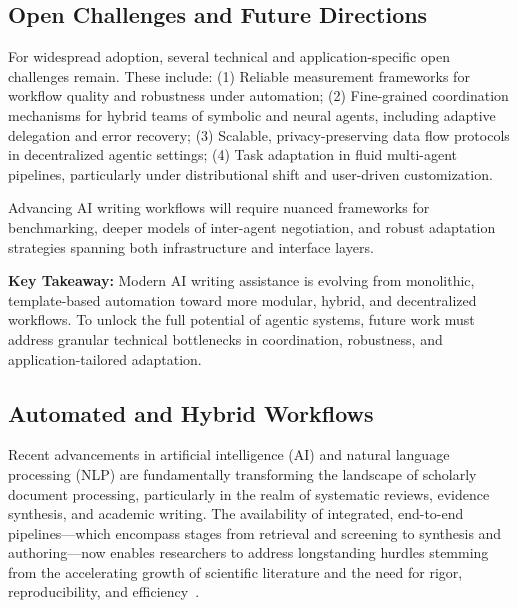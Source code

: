 \documentclass[sigconf]{acmart}
\begin{document}
\subsection{Open Challenges and Future Directions}
For widespread adoption, several technical and application-specific open challenges remain. These include:
(1) Reliable measurement frameworks for workflow quality and robustness under automation;
(2) Fine-grained coordination mechanisms for hybrid teams of symbolic and neural agents, including adaptive delegation and error recovery;
(3) Scalable, privacy-preserving data flow protocols in decentralized agentic settings;
(4) Task adaptation in fluid multi-agent pipelines, particularly under distributional shift and user-driven customization.

Advancing AI writing workflows will require nuanced frameworks for benchmarking, deeper models of inter-agent negotiation, and robust adaptation strategies spanning both infrastructure and interface layers.

\textbf{Key Takeaway:} Modern AI writing assistance is evolving from monolithic, template-based automation toward more modular, hybrid, and decentralized workflows. To unlock the full potential of agentic systems, future work must address granular technical bottlenecks in coordination, robustness, and application-tailored adaptation.

\subsection{Automated and Hybrid Workflows}

Recent advancements in artificial intelligence (AI) and natural language processing (NLP) are fundamentally transforming the landscape of scholarly document processing, particularly in the realm of systematic reviews, evidence synthesis, and academic writing. The availability of integrated, end-to-end pipelines—which encompass stages from retrieval and screening to synthesis and authoring—now enables researchers to address longstanding hurdles stemming from the accelerating growth of scientific literature and the need for rigor, reproducibility, and efficiency~\cite{ref10,ref11,ref12,ref28,ref29,ref30,ref31,ref35,ref36,ref37,ref38,ref39,ref46,ref47,ref49,ref51,ref62,ref76,ref80,ref86,ref88,ref89,ref90,ref91,ref94,ref96,ref97,ref98,ref102,ref108}.
\end{document}
